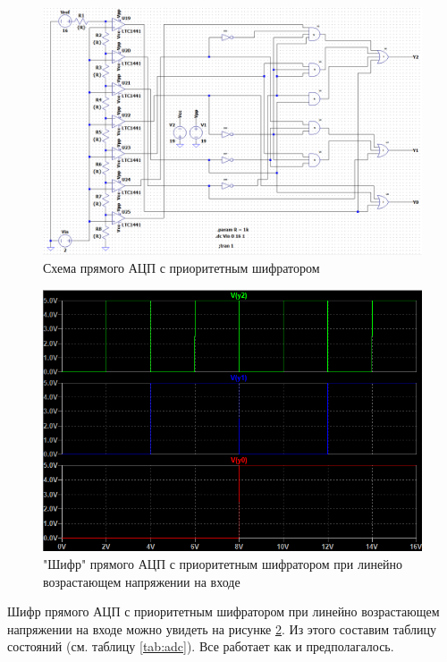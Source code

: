 \begin{figure}[H]
    \centering
    \includegraphics[width=\linewidth]{figs/adc_scheme.png}
    \caption{Схема прямого АЦП с приоритетным шифратором}
    \label{fig:adc_scheme}
\end{figure}

\begin{figure}[H]
    \centering
    \includegraphics[width=\linewidth]{figs/adc_sig.png}
    \caption{"Шифр" прямого АЦП с приоритетным шифратором при линейно возрастающем
    напряжении на входе}
    \label{fig:adc_signals}
\end{figure}

Шифр прямого АЦП с приоритетным шифратором при линейно возрастающем напряжении на входе
можно увидеть на рисунке \ref{fig:adc_signals}. Из этого составим таблицу состояний
(см. таблицу \ref{tab:adc}). Все работает как и предполагалось.

